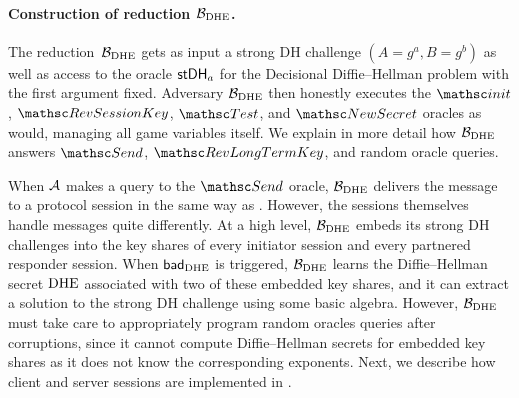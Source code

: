 	
	\paragraph{Construction of reduction $\mathcal{B}_{\mathrm{DHE}}$.}
	The reduction~$\mathcal{B}_{\mathrm{DHE}}$ gets as input a strong DH challenge $(A = g^a, B = g^b)$ as well as access to the oracle $\mathsf{stDH}_a$ for the Decisional Diffie--Hellman problem with the first argument fixed. 
	Adversary $\mathcal{B}_{\mathrm{DHE}}$ then honestly executes the $\Initialize$, $\RevSessionKey$, $\Test$, and $\NewSecret$ oracles as \thisGame would, managing all game variables itself.
	We explain in more detail how $\mathcal{B}_{\mathrm{DHE}}$ answers $\Send$, $\RevLongTermKey$, and random oracle queries. 
	
	When $\mathcal{A}$ makes a query to the $\Send$ oracle, $\mathcal{B}_{\mathrm{DHE}}$ delivers the message to a protocol session in the same way as \thisGame.
	However, the sessions themselves handle messages quite differently.
	At a high level, $\mathcal{B}_{\mathrm{DHE}}$ embeds its strong DH challenges into the key shares of every initiator session and every partnered responder session.
	When $\mathsf{bad}_{\mathrm{DHE}}$ is triggered, $\mathcal{B}_{\mathrm{DHE}}$ learns the Diffie--Hellman secret $\mathrm{DHE}$ associated with two of these embedded key shares, and it can extract a solution to the strong DH challenge using some basic algebra.
	However, $\mathcal{B}_{\mathrm{DHE}}$ must take care to appropriately program random oracles queries after corruptions, since it cannot compute Diffie--Hellman secrets for embedded key shares as it does not know the corresponding exponents.
Next, we describe how client and server sessions are implemented in \thisGame.
	
